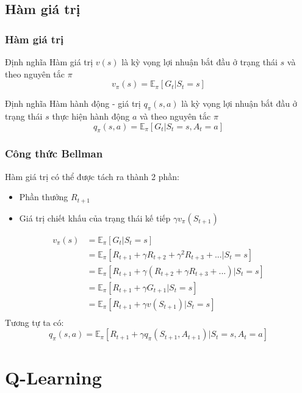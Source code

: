 \documentclass{beamer}
\begin{document}
\subsection{Hàm giá trị}

\begin{frame}
\frametitle{Hàm giá trị}
\begin{block}{Định nghĩa}
Hàm giá trị $v(s)$ là kỳ vọng lợi nhuận bắt đầu ở trạng thái $s$ và theo nguyên tắc $\pi$
$$v_\pi (s)=\mathbb{E}_\pi [G_t|S_t=s]$$
\end{block}

\begin{block}{Định nghĩa}
Hàm hành động - giá trị $q_\pi (s,a)$ là kỳ vọng lợi nhuận bắt đầu ở trạng thái $s$ thực hiện hành động $a$ và theo nguyên tắc $\pi$
$$q_\pi (s,a)=\mathbb{E}_\pi [G_t|S_t=s,A_t=a]$$
\end{block}
\end{frame}

\begin{frame}
\frametitle{Công thức Bellman}
Hàm giá trị có thể được tách ra thành 2 phần:
\begin{itemize}
\item Phần thưởng $R_{t+1}$
\item Giá trị chiết khấu của trạng thái kế tiếp $\gamma v_\pi (S_{t+1})$
\end{itemize}
\begin{equation}
\begin{split}
v_\pi (s) & = \mathbb{E}_\pi [G_t|S_t = s] \\
& = \mathbb{E}_\pi [R_{t+1} + \gamma R_{t+2} + \gamma^2 R_{t+3} + ... | S_t = s] \\
& = \mathbb{E}_\pi [R_{t+1} + \gamma (R_{t+2} + \gamma R_{t+3} + ...) | S_t = s] \\
& = \mathbb{E}_\pi [R_{t+1} + \gamma G_{t+1} | S_t = s] \\
& = \mathbb{E}_\pi [R_{t+1} + \gamma v(S_{t+1}) | S_t = s] \\
\end{split}
\end{equation}
Tương tự ta có:
$$q_\pi (s,a) = \mathbb{E}_\pi [R_{t+1} + \gamma q_\pi (S_{t+1},A_{t+1}) | S_t = s, A_t =a]$$
\end{frame}

\section{Q-Learning}
\end{document}
